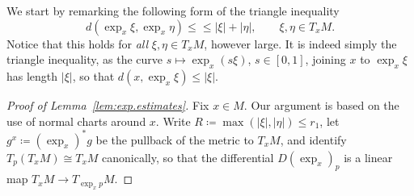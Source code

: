 \documentclass[11pt,reqno]{amsart}
\theoremstyle{plain}
\theoremstyle{definition}
\begin{document}
We start by remarking the following form of the triangle inequality
    \begin{equation}\label{eq:triangle.inequality}
        d\left(\exp_x\xi,\exp_x\eta\right)\le\le\lvert\xi\rvert+\lvert\eta\rvert,\qquad \xi,\eta\in T_xM.
    \end{equation}
Notice that this holds for \emph{all} \(\xi,\eta\in T_xM\), however large.
It is indeed simply the triangle inequality, as the curve \( s\mapsto\exp_x(s\xi) \), \( s\in[0,1] \), joining \( x \) to \( \exp_x\xi \) has length \( \lvert\xi\rvert \), so that \( d(x,\exp_x\xi)\le\lvert\xi\rvert \).

\begin{proof}[Proof of Lemma~\ref{lem:exp.estimates}]
    Fix \(x \in M\).
    Our argument is based on the use of normal charts around \(x\).
    Write \( R\coloneqq \max(\lvert\xi\rvert,\lvert\eta\rvert)\le r_1 \), let \( g^x\coloneqq (\exp_x)^\ast g \) be the pullback of the metric to \( T_xM \), and identify \( T_p(T_xM)\cong T_xM \) canonically, so that the differential \( D(\exp_x)_p \) is a linear map \( T_xM\to T_{\exp_xp}M \).


\end{proof}
\end{document}
